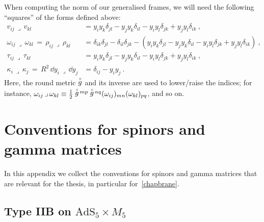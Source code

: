 \documentclass[debug]{phd}
\begin{document}
				When computing the norm of our generalised frames, we will need the following ``squares'' of the forms defined above:
						\begin{equation}\label{contractions_sphere}
							\begin{split}
								v_{ij} \,\lrcorner\, v_{kl} &= y_iy_k \delta_{jl} - y_jy_k \delta_{il} - y_iy_l \delta_{jk} +y_jy_l \delta_{ik}\ , \\[1mm]
								\omega_{ij} \,\lrcorner\, \omega_{kl} \,=\, \rho_{ij}\,\lrcorner\,\rho_{kl} &= \delta_{ik}\delta_{jl}- \delta_{il}\delta_{jk} - (y_iy_k \delta_{jl} - y_jy_k \delta_{il} - y_iy_l \delta_{jk} +y_jy_l \delta_{ik})\ ,  \\[1mm]
								\tau_{ij}\,\lrcorner\,\tau_{kl} &= y_iy_k \delta_{jl} - y_jy_k \delta_{il} - y_iy_l \delta_{jk} +y_jy_l \delta_{ik}\ ,  \\[1mm]
								\kappa_i \,\lrcorner\, \kappa_j \,=\, R^2\, \dd y_i \,\lrcorner\, \dd y_j &=  \delta_{ij} - y_iy_j \ .
							\end{split}
						\end{equation}
Here, the round metric $\stackrel{\scriptscriptstyle{\circ}}{g}$ and its inverse are used to lower/raise the indices; for instance, $\omega_{ij} \,\lrcorner\, \omega_{kl} \equiv \frac{1}{2} \stackrel{\scriptscriptstyle{\circ}}{g}{}^{\!mp}\stackrel{\scriptscriptstyle{\circ}}{g}{}^{\!nq}(\omega_{ij})_{mn}(\omega_{kl})_{pq}$, and so on.
			
		\section{Conventions for spinors and gamma matrices}
\label{app:conv}
In this appendix we collect the conventions for spinors and gamma matrices 
that are relevant for the thesis, in particular for~\cref{chapbrane}. 

\subsection{\texorpdfstring{Type IIB on $\mathrm{AdS}_5 \times M_5$}{Type IIB on AdS5 x M5}}
\label{sect:IIB_notation}
\end{document}
